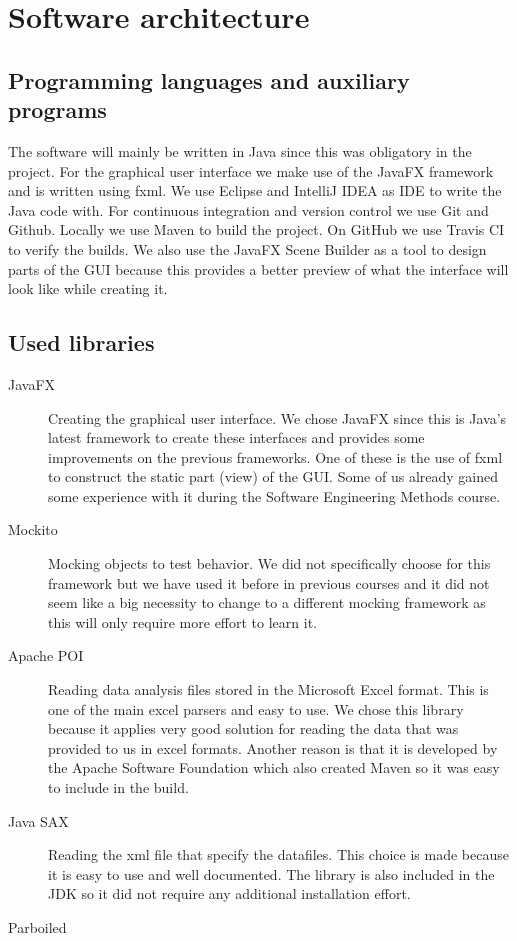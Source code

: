 \documentclass[a4paper]{article}
\begin{document}
\newpage

\section{Software architecture}

\subsection{Programming languages and auxiliary programs}
The software will mainly be written in Java since this was obligatory in
the project. For the graphical user interface we make use of the JavaFX
framework and is written using fxml. We use Eclipse and IntelliJ IDEA as IDE to
write the Java code with. 
For continuous integration and version control we use Git and Github. Locally we use Maven to build the project. On GitHub we use Travis CI to verify the builds.
We also use the JavaFX Scene Builder as a tool to design parts of the GUI because this provides a better preview of what the interface will look like while creating it.

\subsection{Used libraries}
\begin{description}

\item[JavaFX] Creating the graphical user interface. We chose JavaFX since this
is Java's latest framework to create these interfaces and provides some
improvements on the previous frameworks. One of these is the use of fxml to
construct the static part (view) of the GUI. Some of us already gained some
experience with it during the Software Engineering Methods course.

\item[Mockito] Mocking objects to test behavior. We did not specifically choose
for this framework but we have used it before in previous courses and it did not
seem like a big necessity to change to a different mocking framework as this
will only require more effort to learn it.

\item[Apache POI] Reading data analysis files stored in the Microsoft Excel
format. This is one of the main excel parsers and easy to use. We chose this
library because it applies very good solution for reading the data that was
provided to us in excel formats. Another reason is that it is developed by the 
Apache Software Foundation which also created Maven so it was easy to include in
the build.

\item[Java SAX] Reading the xml file that specify the datafiles. This choice is
made because it is easy to use and well documented. The library is also included
in the JDK so it did not require any additional installation effort.

\item[Parboiled]

\end{description}
\end{document}

